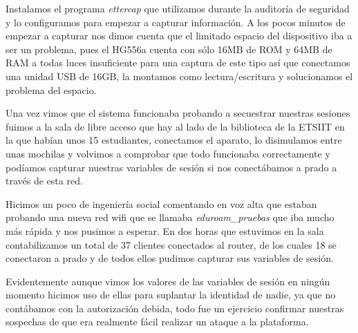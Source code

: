 \bigskip
Instalamos el programa \textit{ettercap} que utilizamos durante la auditoría de seguridad y lo configuramos para empezar a capturar información. A los pocos minutos de empezar a capturar nos dimos cuenta que el limitado espacio del dispositivo iba a ser un problema, pues el HG556a cuenta con sólo 16MB de ROM y 64MB de RAM a todas luces insuficiente para una captura de este tipo así que conectamos una unidad USB de 16GB, la montamos como lectura/escritura y solucionamos el problema del espacio. 

\bigskip
Una vez vimos que el sistema funcionaba probando a secuestrar nuestras sesiones fuimos a la sala de libre acceso que hay al lado de la biblioteca de la ETSIIT en la que habían unos 15 estudiantes, conectamos el aparato, lo disimulamos entre unas mochilas y volvimos a comprobar que todo funcionaba correctamente y podíamos capturar nuestras variables de sesión si nos conectábamos a prado a través de esta red. 

\bigskip
Hicimos un poco de ingeniería social comentando en voz alta que estaban probando una nueva red wifi que se llamaba \textit{eduroam\_pruebas} que iba mucho más rápida y nos pusimos a esperar. En dos horas que estuvimos en la sala contabilizamos un total de 37 clientes conectados al router, de los cuales 18 se conectaron a prado y de todos ellos pudimos capturar sus variables de sesión. 

\bigskip
Evidentemente aunque vimos los valores de las variables de sesión en ningún momento hicimos uso de ellas para suplantar la identidad de nadie, ya que no contábamos con la autorización debida, todo fue un ejercicio confirmar nuestras sospechas de que era realmente fácil realizar un ataque a la plataforma.




